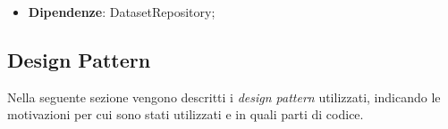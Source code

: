 \begin{itemize}
\begin{itemize}
        Se l'operazione ha buon fine viene restituita la lista dei dataset, altrimenti viene restituito \lstinline|None|.
        \item \lstinline|+ find_by_name(self, name: str)|: si ottiene il dataset salvato con il nome fornito.
        Tramite \lstinline|DatasetSqlAlchemyMapper| e \lstinline|DatasetSqlAlchemyModel| si ottiene il dataset salvato nel database che ha come campo nome \lstinline|name|.
        Se l'operazione ha buon fine viene restituito il dataset ottenuto, altrimento viene restituito \lstinline|None|.
        \item \lstinline|+ get_by_id(self, id: UUID)|: si ottiene il dataset salvato con l'id fornito.
        Tramite \lstinline|DatasetSqlAlchemyMapper| e \lstinline|DatasetSqlAlchemyModel| si ottiene il dataset salvato nel database che ha come campo id l'\lstinline|id| ricevuto. 
        Se l'operazione ha buon fine viene restituito il dataset ottenuto, altrimento viene restituito \lstinline|None|.
    \end{itemize}
    \item \textbf{Dipendenze}: DatasetRepository;
\end{itemize}

\subsection{Design Pattern}
Nella seguente sezione vengono descritti i \textit{design pattern} utilizzati, indicando le motivazioni per cui sono stati utilizzati e in quali parti di codice.

